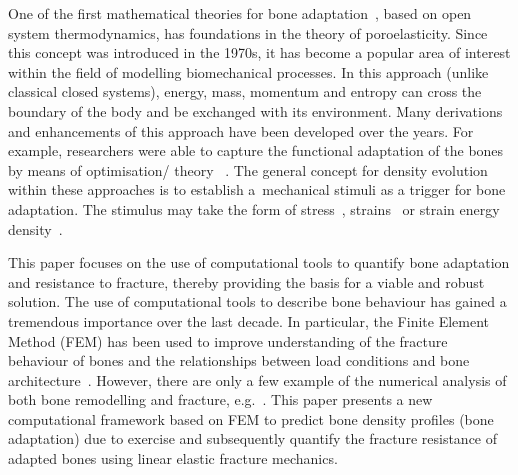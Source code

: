 \documentclass[review]{elsarticle}
\numberwithin{equation}{section}
\begin{document}
One of the first mathematical theories for bone adaptation~\citep{cowin1976bone}, based on open system thermodynamics, has foundations in the theory of poroelasticity. 
Since this concept was introduced in the 1970s, it has become a popular area of interest within the field of modelling biomechanical processes. 
In this approach (unlike classical closed systems), energy, mass, momentum and entropy can cross the boundary of the body and 
be exchanged with its environment. 
Many derivations and enhancements of this approach have been developed over the years. 
For example, researchers were able to capture the functional adaptation of the bones by means of optimisation/ theory
~\citep{harrigan1996bone, jacobs1995numerical, weinans1992behavior}.
The general concept for density evolution within these approaches is to establish a~mechanical stimuli as a trigger for bone adaptation. 
The stimulus may take the form of stress~\citep{beaupre1990approach, carter1996mechanical, doblare2002anisotropic}, strains~\citep{cowin1976bone} or strain energy density~\citep{weinans1992behavior, kuhl2003theory,kaczmarczyk2011efficient, Connor2017bone}. 

This paper focuses on the use of computational tools to quantify bone adaptation and resistance to fracture, thereby providing the basis for a 
viable and robust solution.
The use of computational tools to describe bone behaviour has gained a tremendous importance over the last decade. 
In particular, the Finite Element Method (FEM) has been used to improve understanding of the fracture behaviour of bones and the relationships between load conditions and bone architecture~\citep{podshivalov2014road, poelert2013patient}. However, there are only a few example of the numerical analysis of both bone remodelling and fracture, e.g.~\citep{hambli2013integrated}. This paper presents a new computational framework based on FEM to predict bone density profiles 
(bone adaptation) due to exercise and subsequently quantify the fracture resistance of 
adapted bones using linear elastic fracture mechanics. 
\end{document}
